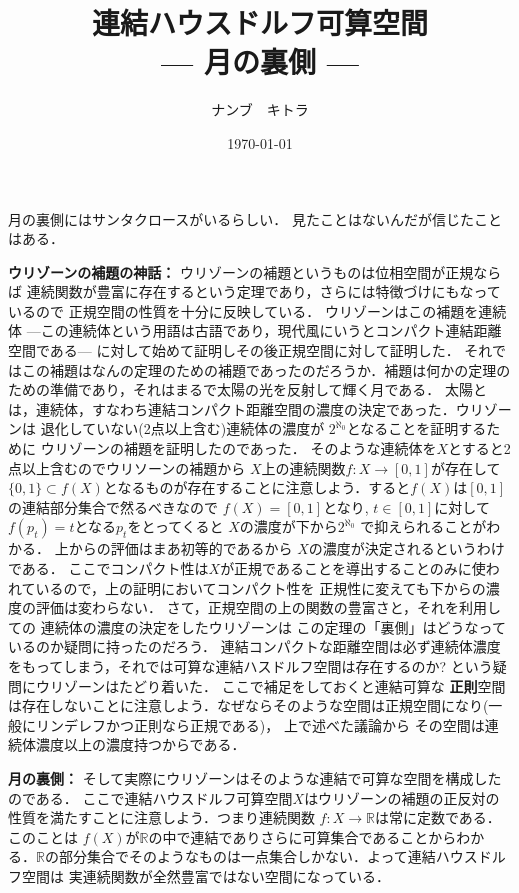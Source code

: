 \documentclass[leqno, a4paper, 12pt]{jsarticle}
\title{連結ハウスドルフ可算空間
\large{\\--- 月の裏側 ---}}
\author{ナンブ　キトラ}
\date{\today}
\newcommand{\rr}{\mathbb{R}}
\begin{document}
\maketitle

月の裏側にはサンタクロースがいるらしい．
見たことはないんだが信じたことはある．

\textbf{ウリゾーンの補題の神話：}
ウリゾーンの補題というものは位相空間が正規ならば
連続関数が豊富に存在するという定理であり，さらには特徴づけにもなっているので
正規空間の性質を十分に反映している．
ウリゾーンはこの補題を連続体 ---この連続体という用語は古語であり，現代風にいうとコンパクト連結距離空間である---
に対して始めて証明しその後正規空間に対して証明した． 
それではこの補題はなんの定理のための補題であったのだろうか．補題は何かの定理のための準備であり，それはまるで太陽の光を反射して輝く月である．
太陽とは，連続体，すなわち連結コンパクト距離空間の濃度の決定であった．ウリゾーンは
退化していない(2点以上含む)連続体の濃度が
$2^{\aleph_{0}}$となることを証明するために
ウリゾーンの補題を証明したのであった．
そのような連続体を$X$とすると2点以上含むのでウリソーンの補題から
$X$上の連続関数$f\colon X\to [0, 1]$が存在して
$\{0, 1\}\subset  f(X)$となるものが存在することに注意しよう．すると$f(X)$は$[0, 1]$の連結部分集合で然るべきなので
$f(X)=[0, 1]$となり, $t\in [0, 1]$に対して
$f(p_{t})=t$となる$p_{t}$をとってくると
$X$の濃度が下から$2^{\aleph_{0}}$
で抑えられることがわかる．
上からの評価はまあ初等的であるから
$X$の濃度が決定されるというわけである．
ここでコンパクト性は$X$が正規であることを導出することのみに使われているので，上の証明においてコンパクト性を
正規性に変えても下からの濃度の評価は変わらない．
さて，正規空間の上の関数の豊富さと，それを利用しての
連続体の濃度の決定をしたウリゾーンは
この定理の「裏側」はどうなっているのか疑問に持ったのだろう．
連結コンパクトな距離空間は必ず連続体濃度をもってしまう，それでは可算な連結ハスドルフ空間は存在するのか?
という疑問にウリゾーンはたどり着いた．
ここで補足をしておくと連結可算な
\textbf{正則}空間は存在しないことに注意しよう．なぜならそのような空間は正規空間になり(一般にリンデレフかつ正則なら正規である)，
上で述べた議論から
その空間は連続体濃度以上の濃度持つからである．

\textbf{月の裏側：}
そして実際にウリゾーンはそのような連結で可算な空間を構成したのである．
ここで連結ハウスドルフ可算空間$X$はウリゾーンの補題の正反対の性質を満たすことに注意しよう．つまり連続関数
$f\colon X\to \rr$は常に定数である．このことは
$f(X)$が$\rr$の中で連結でありさらに可算集合であることからわかる．$\rr$の部分集合でそのようなものは一点集合しかない．よって連結ハウスドルフ空間は
実連続関数が全然豊富ではない空間になっている．
\end{document}
